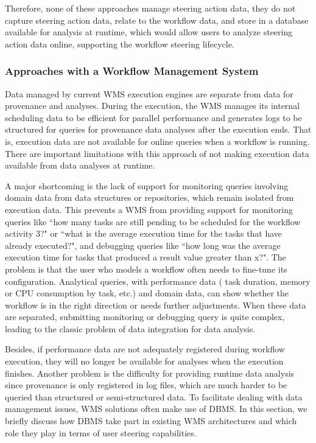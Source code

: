 Therefore, none of these approaches manage steering action data, \ie{} they do not capture steering action data, relate to the workflow data, and store in a database available for analysis at runtime, which would allow users to analyze steering action data online, supporting the workflow steering lifecycle.


\subsubsection{Approaches with a Workflow Management System}

Data managed by current WMS execution engines are separate
from data for provenance and analyses. During the execution, the WMS
manages its internal scheduling data to be efficient for parallel
performance and generates logs to be structured for queries for
provenance data analyses after the execution ends. That is, execution
data are not available for online queries when a workflow is running.
There are important limitations with this approach of not making
execution data available from data analyses at runtime.

A major shortcoming is the lack of support for monitoring queries
involving domain data from data structures or repositories, which remain
isolated from execution data. This prevents a WMS from providing
support for monitoring queries like ``how many tasks are still pending to
be scheduled for the workflow activity 3?" or ``what is the average
execution time for the tasks that have already executed?", and debugging
queries like ``how long was the average execution time for tasks that
produced a result value greater than x?". The problem is that the user
who models a workflow often needs to fine-tune its configuration.
Analytical queries, with performance data (\eg{} task duration,
memory or CPU consumption by task, etc.) and domain data, can show
whether the workflow is in the right direction or needs further
adjustments. When these data are separated, submitting monitoring or
debugging query is quite complex, leading to the classic problem of data
integration for data analysis.

Besides, if performance data are not adequately registered during
workflow execution, they will no longer be available for analyses when
the execution finishes. Another problem is the difficulty for providing
runtime data analysis since provenance is only registered in log files,
which are much harder to be queried than structured or semi-structured
data. To facilitate dealing with data management issues, WMS solutions often
make use of DBMS. In this section, we briefly discuss how DBMS take part
in existing WMS architectures and which role they play in terms of user steering capabilities.

